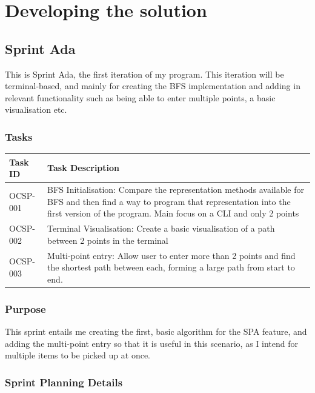 \chapter{Developing the solution}


\section{Sprint Ada}

This is Sprint Ada, the first iteration of my program. This iteration will be terminal-based, and mainly for creating the BFS implementation and adding in relevant functionality such as being able to enter multiple points, a basic visualisation etc.

\subsection{Tasks}

\begin{table}[htbp]
\centering
\begin{tabularx}{\textwidth}{|l|X|}
\hline
\textbf{Task ID} & \textbf{Task Description} \\
\hline
OCSP-001 & BFS Initialisation: Compare the representation methods available for BFS and then find a way to program that representation into the first version of the program. Main focus on a CLI and only 2 points \\
\hline
OCSP-002 & Terminal Visualisation: Create a basic visualisation of a path between 2 points in the terminal\\
\hline
OCSP-003 & Multi-point entry: Allow user to enter more than 2 points and find the shortest path between each, forming a large path from start to end. \\
\hline
\end{tabularx}
\end{table}

\subsection{Purpose}

This sprint entails me creating the first, basic algorithm for the SPA feature, and adding the multi-point entry so that it is useful in this scenario, as I intend for multiple items to be picked up at once.


\clearpage
\subsection{Sprint Planning Details}

